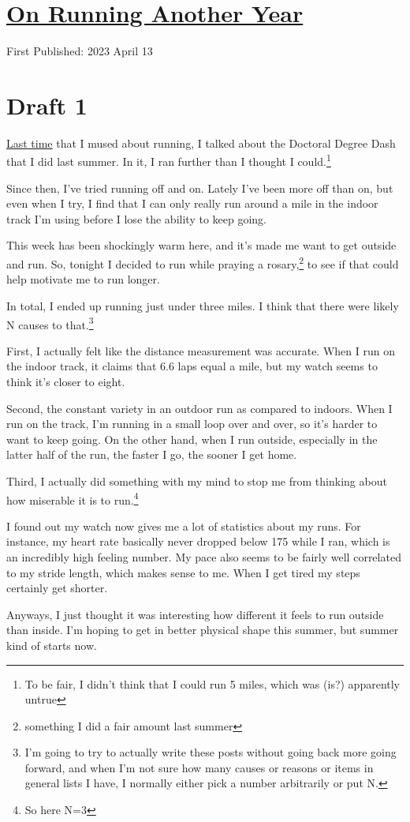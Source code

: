 \documentclass[12pt]{article}[titlepage]
\newcommand{\1}{\={a}}
\newcommand{\2}{\={e}}
\newcommand{\3}{\={\i}}
\newcommand{\4}{\=o}
\newcommand{\5}{\=u}
\newcommand{\6}{\={A}}
\renewcommand{\,}{\textsuperscript{,}}
\begin{document}
\doublespacing
\section{\href{running-2.html}{On Running Another Year}}
First Published: 2023 April 13
\section{Draft 1}
\href{running-1.html}{Last time} that I mused about running, I talked about the Doctoral Degree Dash that I did last summer.
In it, I ran further than I thought I could.\footnote{To be fair, I didn't think that I could run 5 miles, which was (is?) apparently untrue}

Since then, I've tried running off and on.
Lately I've been more off than on, but even when I try, I find that I can only really run around a mile in the indoor track I'm using before I lose the ability to keep going.

This week has been shockingly warm here, and it's made me want to get outside and run.
So, tonight I decided to run while praying a rosary,\footnote{something I did a fair amount last summer} to see if that could help motivate me to run longer.

In total, I ended up running just under three miles.
I think that there were likely N causes to that.\footnote{I'm going to try to actually write these posts without going back more going forward, and when I'm not sure how many causes or reasons or items in general lists I have, I normally either pick a number arbitrarily or put N.}

First, I actually felt like the distance measurement was accurate.
When I run on the indoor track, it claims that 6.6 laps equal a mile, but my watch seems to think it's closer to eight.

Second, the constant variety in an outdoor run as compared to indoors.
When I run on the track, I'm running in a small loop over and over, so it's harder to want to keep going.
On the other hand, when I run outside, especially in the latter half of the run, the faster I go, the sooner I get home.

Third, I actually did something with my mind to stop me from thinking about how miserable it is to run.\footnote{So here N=3}

I found out my watch now gives me a lot of statistics about my runs.
For instance, my heart rate basically never dropped below 175 while I ran, which is an incredibly high feeling number.
My pace also seems to be fairly well correlated to my stride length, which makes sense to me.
When I get tired my steps certainly get shorter.

Anyways, I just thought it was interesting how different it feels to run outside than inside.
I'm hoping to get in better physical shape this summer, but summer kind of starts now.
\end{document}
